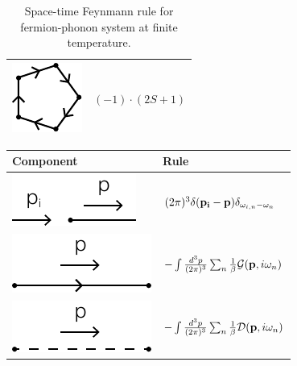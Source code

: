 \documentclass[12pt]{book}
\begin{document}
\begin{table}[htp!]
\begin{tabular}{| >{\centering\arraybackslash}m{15em}|>{\centering\arraybackslash} m{12em}|}
		\hline
		\vspace{2.5ex}\includegraphics[scale=1]{resources/chap_feyn_diag/fdiag_frule6.pdf}\vspace{1ex}&$(-1)\cdot(2S+1)$\vspace{0.5ex}\\
		\hline
		\end{tabular}
		\caption{Space-time Feynmann rule for fermion-phonon system at finite temperature.}
		\label{tab:space_frule_ft}
	\end{table}
	
	\begin{table}[htp!]
		\centering
		\begin{tabular}{| >{\centering\arraybackslash}m{15em}|>{\centering\arraybackslash} m{24em}|}
		\hline
		\vspace{0.5ex}Component\vspace{0.5ex}&\vspace{0.5ex}Rule\vspace{0.5ex}\\
		\hline
		\vspace{2.5ex}\includegraphics[scale=1]{resources/chap_feyn_diag/fdiag_frulep6.pdf}\vspace{1ex}&$(2\pi)^3\delta({\bf p_i}-{\bf p})\delta_{\omega_{i,n}-\omega_n}$\vspace{0.5ex}\\
		\hline
		\vspace{2.5ex}\includegraphics[scale=1]{resources/chap_feyn_diag/fdiag_frulep1.pdf}\vspace{1ex}&$-\int\frac{d^3p}{(2\pi)^3}\sum_n \frac1\beta\mathcal G({\bf p},i\omega_n)$\vspace{0.5ex}\\
		\hline
		\vspace{2.5ex}\includegraphics[scale=1]{resources/chap_feyn_diag/fdiag_frulep2.pdf}\vspace{1ex}&$-\int\frac{d^3p}{(2\pi)^3}\sum_n \frac1\beta\mathcal D({\bf p},i\omega_n)$\vspace{0.5ex}\\

\end{tabular}
\end{table}
\end{document}
